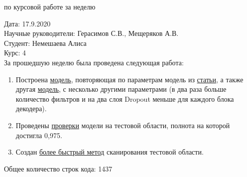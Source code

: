 \documentclass{article}
\begin{document}
\begin{center}{ по курсовой работе за неделю\\}\end{center}
Дата: 17.9.2020\\
Научные руководители: Герасимов С.В., Мещеряков А.В.\\
Студент: Немешаева Алиса\\
Курс: 4\\

\renewcommand{\labelitemi}{$\blacksquare$}
\renewcommand\labelitemii{$\square$}
За прошедшую неделю была проведена следующая работа:\\
\begin{enumerate}
    \item Построена \hyperlink{https://github.com/rt2122/data-segmentation-2/blob/master/Planck\_Unet/train\_unet\_planck\_z\_8\_filters.ipynb}{модель}, повторяющая по параметрам модель из \hyperlink{https://www.aanda.org/articles/aa/pdf/2020/02/aa36919-19.pdf}{статьи}, а также другая \hyperlink{https://github.com/rt2122/data-segmentation-2/blob/master/Planck\_Unet/train\_unet\_planck\_z.ipynb}{модель}, с несколько другими параметрами (в два раза больше количество фильтров и на два слоя Dropout меньше для каждого блока декодера).\\
    \item Проведены \hyperlink{https://github.com/rt2122/data-segmentation-2/blob/master/Planck\_Unet/scan\_planck\_z\_f8.ipynb}{проверки} модели на тестовой области, полнота на которой достигла 0,975.\\
    \item Создан \hyperlink{https://github.com/rt2122/data-segmentation-2/blob/master/modules/DS\_detector.py}{более быстрый метод} сканирования тестовой области.\\

\end{enumerate}

Общее количество строк кода: 1437\\
\end{document}

